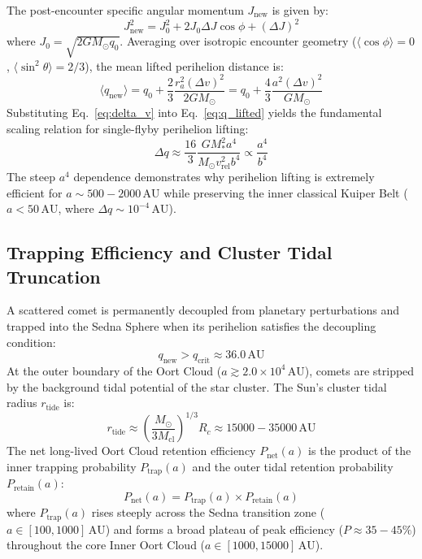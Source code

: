 \documentclass[11pt,a4paper]{article}
\begin{document}
The post-encounter specific angular momentum $J_{\text{new}}$ is given by:
\begin{equation}
J_{\text{new}}^2 = J_0^2 + 2 J_0 \Delta J \cos\phi + (\Delta J)^2
\label{eq:j_new}
\end{equation}
where $J_0 = \sqrt{2 G M_\odot q_0}$. Averaging over isotropic encounter geometry ($\langle \cos\phi \rangle = 0$, $\langle \sin^2\theta \rangle = 2/3$), the mean lifted perihelion distance is:
\begin{equation}
\langle q_{\text{new}} \rangle = q_0 + \frac{2}{3} \frac{r_a^2 (\Delta v)^2}{2 G M_\odot} = q_0 + \frac{4}{3} \frac{a^2 (\Delta v)^2}{G M_\odot}
\label{eq:q_lifted}
\end{equation}
Substituting Eq.~\eqref{eq:delta_v} into Eq.~\eqref{eq:q_lifted} yields the fundamental scaling relation for single-flyby perihelion lifting:
\begin{equation}
\Delta q \approx \frac{16}{3} \frac{G M_*^2 a^4}{M_\odot v_{\text{rel}}^2 b^4} \propto \frac{a^4}{b^4}
\label{eq:delta_q_scaling}
\end{equation}
The steep $a^4$ dependence demonstrates why perihelion lifting is extremely efficient for $a \sim 500 - 2000\,\text{AU}$ while preserving the inner classical Kuiper Belt ($a < 50\,\text{AU}$, where $\Delta q \sim 10^{-4}\,\text{AU}$).

\subsection{Trapping Efficiency and Cluster Tidal Truncation}
A scattered comet is permanently decoupled from planetary perturbations and trapped into the Sedna Sphere when its perihelion satisfies the decoupling condition:
\begin{equation}
q_{\text{new}} > q_{\text{crit}} \approx 36.0\,\text{AU}
\label{eq:decoupling}
\end{equation}
At the outer boundary of the Oort Cloud ($a \gtrsim 2.0 \times 10^4\,\text{AU}$), comets are stripped by the background tidal potential of the star cluster. The Sun's cluster tidal radius $r_{\text{tide}}$ is:
\begin{equation}
r_{\text{tide}} \approx \left( \frac{M_\odot}{3 M_{\text{cl}}} \right)^{1/3} R_c \approx 15000 - 35000\,\text{AU}
\label{eq:r_tide}
\end{equation}
The net long-lived Oort Cloud retention efficiency $P_{\text{net}}(a)$ is the product of the inner trapping probability $P_{\text{trap}}(a)$ and the outer tidal retention probability $P_{\text{retain}}(a)$:
\begin{equation}
P_{\text{net}}(a) = P_{\text{trap}}(a) \times P_{\text{retain}}(a)
\label{eq:p_net}
\end{equation}
where $P_{\text{trap}}(a)$ rises steeply across the Sedna transition zone ($a \in [100, 1000]\,\text{AU}$) and forms a broad plateau of peak efficiency ($P \approx 35 - 45\%$) throughout the core Inner Oort Cloud ($a \in [1000, 15000]\,\text{AU}$).
\end{document}
